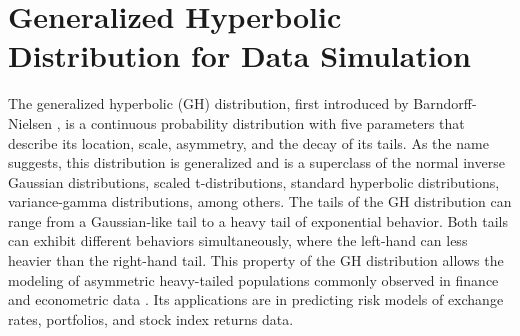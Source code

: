 



\section{Generalized Hyperbolic Distribution for Data Simulation}
\label{sec:ghd_ch3}
The generalized hyperbolic (GH) distribution, first introduced by Barndorff-Nielsen \cite{Barndorff1977}, is a continuous probability distribution with five parameters that describe its location, scale, asymmetry, and the decay of its tails. As the name suggests, this distribution is generalized and is a superclass of the normal inverse Gaussian distributions, scaled t-distributions, standard hyperbolic distributions, variance-gamma distributions, among others. The tails of the GH distribution can range from a Gaussian-like tail to a heavy tail of exponential behavior. Both tails can exhibit different behaviors simultaneously, where the left-hand can less heavier than the right-hand tail. This property of the GH distribution allows the modeling of asymmetric heavy-tailed populations commonly observed in finance and econometric data \cite{Takahashi2016, Nwobi2014, Necula2009, Aas2006, Bibby2003}. Its applications are in predicting risk models of exchange rates, portfolios, and stock index returns data. 

